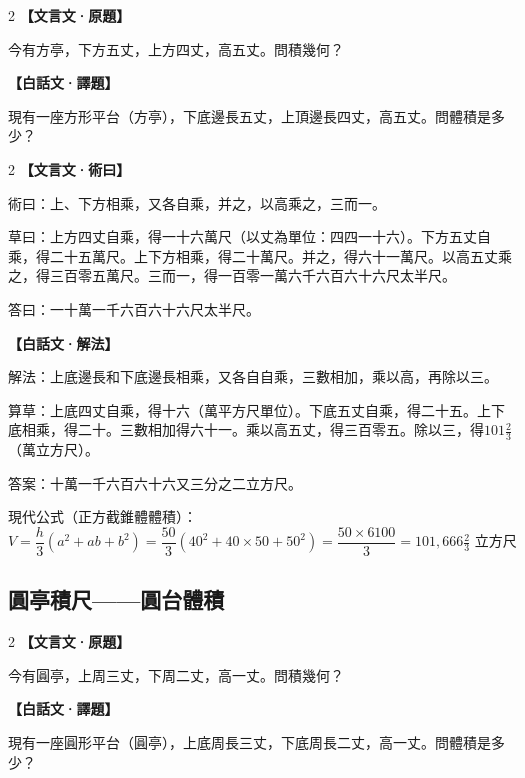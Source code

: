 \documentclass[11pt,a4paper]{article}
\newcommand{\zhc}{}[1]{{\CJKfamily{\CJKrmdefault}#1}}  %
\newcommand{\zhm}[1]{{\CJKfamily{\CJKrmdefault}#1}}  %
\newenvironment{prob bilingual}[1][]{%
  \begin{paracol}{2}%
  \setlength{\columnseprule}{0.4pt}%
}{%
  \end{paracol}%
  \medskip%
}
\begin{document}
\begin{paracol}{2}
\switchcolumn[0]
\noindent\textbf{\textcolor{notecolor}{\zhc{【文言文·原題】}}}\par\smallskip
\zhc{
今有方亭，下方五丈，上方四丈，高五丈。問積幾何？
}

\switchcolumn[1]
\noindent\textbf{\textcolor{notecolor}{\zhm{【白話文·譯題】}}}\par\smallskip
\zhm{
現有一座方形平台（方亭），下底邊長五丈，上頂邊長四丈，高五丈。問體積是多少？
}
\end{paracol}

\medskip

\begin{paracol}{2}
\switchcolumn[0]
\noindent\textbf{\textcolor{notecolor}{\zhc{【文言文·術曰】}}}\par\smallskip
\zhc{
術曰：上、下方相乘，又各自乘，并之，以高乘之，三而一。

草曰：上方四丈自乘，得一十六萬尺（以丈為單位：四四一十六）。下方五丈自乘，得二十五萬尺。上下方相乘，得二十萬尺。并之，得六十一萬尺。以高五丈乘之，得三百零五萬尺。三而一，得一百零一萬六千六百六十六尺太半尺。

答曰：一十萬一千六百六十六尺太半尺。
}

\switchcolumn[1]
\noindent\textbf{\textcolor{notecolor}{\zhm{【白話文·解法】}}}\par\smallskip
\zhm{
解法：上底邊長和下底邊長相乘，又各自自乘，三數相加，乘以高，再除以三。

算草：上底四丈自乘，得十六（萬平方尺單位）。下底五丈自乘，得二十五。上下底相乘，得二十。三數相加得六十一。乘以高五丈，得三百零五。除以三，得$101\frac{2}{3}$（萬立方尺）。

答案：十萬一千六百六十六又三分之二立方尺。

現代公式（正方截錐體體積）：
$$V = \frac{h}{3}(a^2 + ab + b^2) = \frac{50}{3}(40^2 + 40 \times 50 + 50^2) = \frac{50 \times 6100}{3} = 101{,}666\tfrac{2}{3} \text{ 立方尺}$$
}
\end{paracol}

\vspace{0.5cm}

\subsection{\zhc{圓亭積尺——圓台體積}}

\begin{paracol}{2}
\switchcolumn[0]
\noindent\textbf{\textcolor{notecolor}{\zhc{【文言文·原題】}}}\par\smallskip
\zhc{
今有圓亭，上周三丈，下周二丈，高一丈。問積幾何？
}

\switchcolumn[1]
\noindent\textbf{\textcolor{notecolor}{\zhm{【白話文·譯題】}}}\par\smallskip
\zhm{
現有一座圓形平台（圓亭），上底周長三丈，下底周長二丈，高一丈。問體積是多少？
}
\end{paracol}
\end{document}
